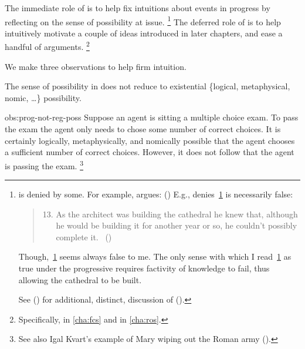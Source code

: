 \begin{note}
  The immediate role of \assuPP{} is to help fix intuitions about events in progress by reflecting on the sense of possibility at issue.%
  \footnote{
     is denied by some.
    For example, \citeauthor{Szabo:2004ul} argues:
    (\citeyear[40]{Szabo:2004ul})
    E.g., \citeauthor{Szabo:2004ul} denies~\ref{Szabo:Arch} is necessarily false:
    \begin{quote}
      \begin{enumerate}[label=(\arabic*), ref=(\arabic*)]
        \setcounter{enumi}{12}
      \item
        \label{Szabo:Arch}
        As the architect was building the cathedral he knew that, although he would be building it for another year or so, he couldn't possibly complete it.%
        \mbox{ }\hfill\mbox{(\citeyear[38]{Szabo:2004ul})}
      \end{enumerate}
    \end{quote}
    Though,~\ref{Szabo:Arch} seems always false to me.
    The only sense with which I read~\ref{Szabo:Arch} as true under the progressive requires factivity of knowledge to fail, thus allowing the cathedral to be built.

    See (\cite[1245]{Portner:2011vi}) for additional, distinct, discussion of (\cite{Szabo:2004ul}).
  }
  The deferred role of \assuPP{} is to help intuitively motivate a couple of ideas introduced in later chapters, and ease a handful of arguments.%
  \footnote{
    Specifically,  in \autoref{cha:fcs} and  in \autoref{cha:ros}.
  }

  We make three observations to help firm intuition.

  \begin{observation}%
    \label{obs:prog-not-reg-poss}%
    The sense of possibility in \assuPP{} does not reduce to existential \{logical, metaphysical, nomic, \dots\} possibility.
  \end{observation}
  \begin{motivation}{obs:prog-not-reg-poss}
    Suppose an agent is sitting a multiple choice exam.
    To pass the exam the agent only needs to chose some number of correct choices.
    It is certainly logically, metaphysically, and nomically possible that the agent chooses a sufficient number of correct choices.
    However, it does not follow that the agent is passing the exam.%
    \footnote{
      See also Igal Kvart's example of Mary wiping out the Roman army (\cite[18]{Landman:1992wh}).
    }
  \end{motivation}


\end{note}
